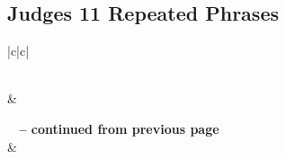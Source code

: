 \subsection{Judges 11 Repeated Phrases}


\normalsize
 
\begin{center}
\begin{longtable}{|c|c|}
\caption[Judges 11 Repeated Phrases]{Judges1 1 Repeated Phrases}\label{table:Repeated Phrases Judges 11} \\
\hline {} &  \\ \hline 
\endfirsthead
 
{{\bfseries \tablename\ \thetable{} -- continued from previous page}} \\  
\hline {} &  \\ \hline 
\endhead
 

\end{longtable}
\end{center}
